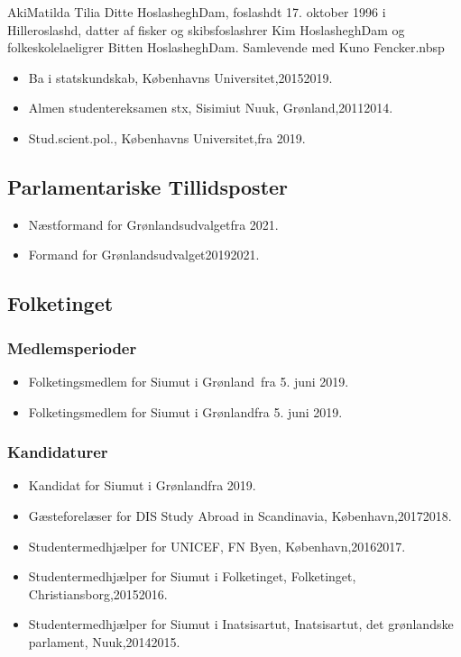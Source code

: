 \documentclass[11pt, a4paper]{awesome-cv}
\begin{document}
\makecvheader[R]
\makelettertitle
\begin{cvletter}
AkiMatilda Tilia Ditte HoslasheghDam, foslashdt 17. oktober 1996 i Hilleroslashd, datter af fisker og skibsfoslashrer Kim HoslasheghDam og folkeskolelaeligrer Bitten HoslasheghDam. Samlevende med Kuno Fencker.nbsp

\begin{itemize}
\item Ba i statskundskab, Københavns Universitet,20152019.
\item Almen studentereksamen stx, Sisimiut  Nuuk, Grønland,20112014.
\item Stud.scient.pol., Københavns Universitet,fra 2019.
\end{itemize}
\subsection*{Parlamentariske Tillidsposter}
\begin{itemize}
\item Næstformand for Grønlandsudvalgetfra 2021.
\item Formand for Grønlandsudvalget20192021.
\end{itemize}
\subsection*{Folketinget}
\subsubsection*{Medlemsperioder}
\begin{itemize}
\item Folketingsmedlem for Siumut i Grønland fra 5. juni 2019.
\item Folketingsmedlem for Siumut i Grønlandfra 5. juni 2019.
\end{itemize}
\subsubsection*{Kandidaturer}
\begin{itemize}
\item Kandidat for Siumut i Grønlandfra 2019.
\end{itemize}
\begin{itemize}
\item Gæsteforelæser for DIS Study Abroad in Scandinavia, København,20172018.
\item Studentermedhjælper for UNICEF, FN Byen, København,20162017.
\item Studentermedhjælper for Siumut i Folketinget, Folketinget, Christiansborg,20152016.
\item Studentermedhjælper for Siumut i Inatsisartut, Inatsisartut, det grønlandske parlament, Nuuk,20142015.
\end{itemize}
\end{cvletter}
\end{document}
